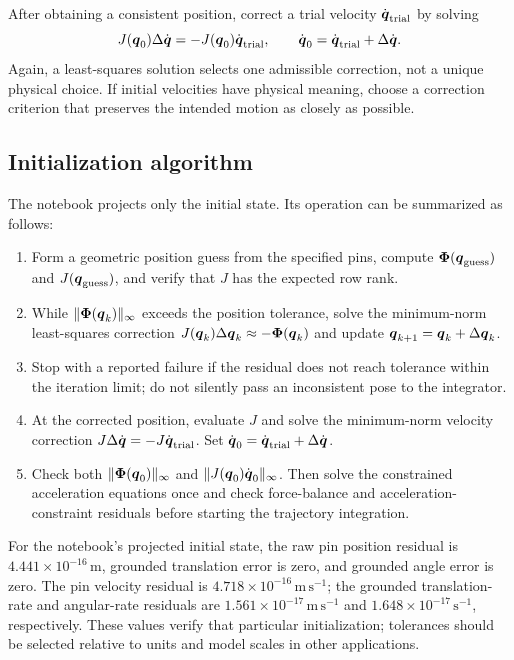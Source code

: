 \documentclass[../main.tex]{subfiles}
\begin{document}
After obtaining a consistent position, correct a trial velocity $\dot{\boldsymbol{q}}_{\mathrm{trial}}$ by solving
\begin{equation}
	J(\boldsymbol{q}_0)\Delta\dot{\boldsymbol{q}}
	=-J(\boldsymbol{q}_0)\dot{\boldsymbol{q}}_{\mathrm{trial}},
	\qquad
	\dot{\boldsymbol{q}}_0=\dot{\boldsymbol{q}}_{\mathrm{trial}}+\Delta\dot{\boldsymbol{q}}.
	\label{eq:velocity-projection-step}
\end{equation}
Again, a least-squares solution selects one admissible correction, not a unique physical choice. If initial velocities have physical meaning, choose a correction criterion that preserves the intended motion as closely as possible.

\subsection{Initialization algorithm}

The notebook projects only the initial state. Its operation can be summarized as follows:
\begin{enumerate}
\item Form a geometric position guess from the specified pins, compute $\boldsymbol{\Phi}(\boldsymbol{q}_{\mathrm{guess}})$ and $J(\boldsymbol{q}_{\mathrm{guess}})$, and verify that $J$ has the expected row rank.
\item While $\|\boldsymbol{\Phi}(\boldsymbol{q}_k)\|_\infty$ exceeds the position tolerance, solve the minimum-norm least-squares correction $J(\boldsymbol{q}_k)\Delta\boldsymbol{q}_k\approx-\boldsymbol{\Phi}(\boldsymbol{q}_k)$ and update $\boldsymbol{q}_{k+1}=\boldsymbol{q}_k+\Delta\boldsymbol{q}_k$.
\item Stop with a reported failure if the residual does not reach tolerance within the iteration limit; do not silently pass an inconsistent pose to the integrator.
\item At the corrected position, evaluate $J$ and solve the minimum-norm velocity correction $J\Delta\dot{\boldsymbol{q}}=-J\dot{\boldsymbol{q}}_{\mathrm{trial}}$. Set $\dot{\boldsymbol{q}}_0=\dot{\boldsymbol{q}}_{\mathrm{trial}}+\Delta\dot{\boldsymbol{q}}$.
\item Check both $\|\boldsymbol{\Phi}(\boldsymbol{q}_0)\|_\infty$ and $\|J(\boldsymbol{q}_0)\dot{\boldsymbol{q}}_0\|_\infty$. Then solve the constrained acceleration equations once and check force-balance and acceleration-constraint residuals before starting the trajectory integration.
\end{enumerate}
For the notebook's projected initial state, the raw pin position residual is $4.441\times10^{-16}\,\mathrm m$, grounded translation error is zero, and grounded angle error is zero. The pin velocity residual is $4.718\times10^{-16}\,\mathrm{m\,s^{-1}}$; the grounded translation-rate and angular-rate residuals are $1.561\times10^{-17}\,\mathrm{m\,s^{-1}}$ and $1.648\times10^{-17}\,\mathrm{s^{-1}}$, respectively. These values verify that particular initialization; tolerances should be selected relative to units and model scales in other applications.
\end{document}

